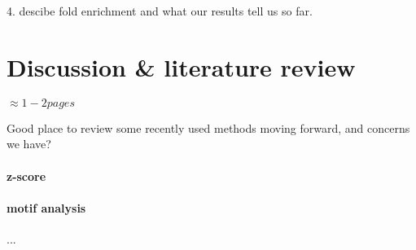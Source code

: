 \documentclass{article}
\newcommand{\beginsupplement}{%
        \setcounter{table}{0}
        \renewcommand{\thetable}{S\arabic{table}}%
        \setcounter{figure}{0}
        \renewcommand{\thefigure}{S\arabic{figure}}%
     }
\begin{document}
4. descibe fold enrichment and what our results tell us so far.

\section*{Discussion \& literature review}

$\approx 1-2 pages$

Good place to review some recently used methods moving forward, and concerns we have?

\paragraph{z-score}

\paragraph{motif analysis}

...





\end{document}
